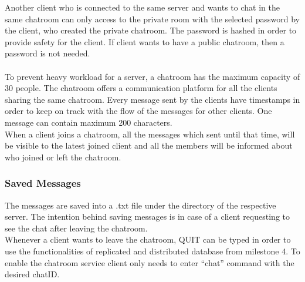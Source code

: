 Another client who is connected to the same server and wants to chat in the same chatroom can only access to the private room with the selected password by the client, who created the private chatroom. The password is hashed in order to provide safety for the client. If client wants to have a public chatroom, then a password is not needed.\\
\\
To prevent heavy workload for a server, a chatroom has the maximum capacity of 30 people. The chatroom offers a communication platform for all the clients sharing the same chatroom. Every message sent by the clients have timestamps in order to keep on track with the flow of the messages for other clients. One message can contain maximum 200 characters.\\
When a client joins a chatroom, all the messages which sent until that time, will be visible to the latest joined client and all the members will be informed about who joined or left the chatroom. 
\subsubsection{Saved Messages}
\label{sec:groupchat_executionoftheworkflow_savedmessages}

The messages are saved into a .txt file under the directory of the respective server. The intention behind saving messages is in case of a client requesting to see the chat after leaving the chatroom.\\

Whenever a client wants to leave the chatroom, QUIT can be typed in order to use the functionalities of replicated and distributed database from milestone 4. To enable the chatroom service client only needs to enter “chat” command with the desired chatID. 



